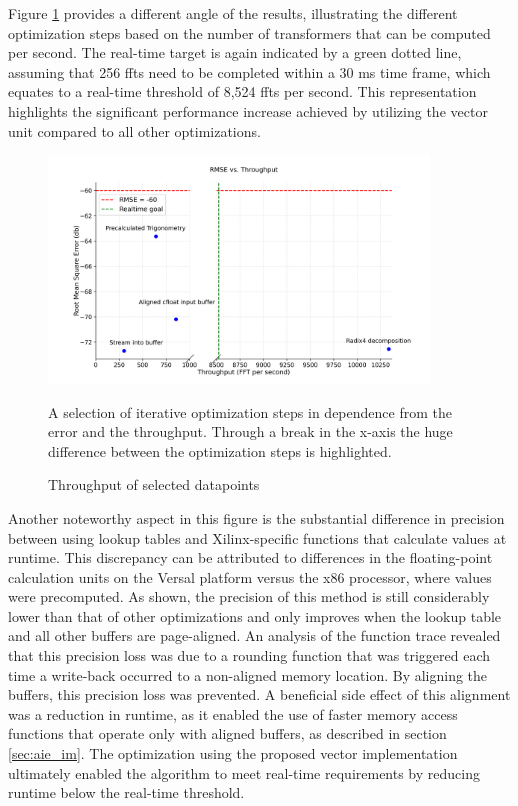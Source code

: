 Figure \ref{fig:plot2} provides a different angle of the results, illustrating the different optimization steps based on the number of transformers that can be computed per second. The real-time target is again indicated by a green dotted line, assuming that 256 \ac{fft}s need to be completed within a 30 ms time frame, which equates to a real-time threshold of 8,524 \ac{fft}s per second. This representation highlights the significant performance increase achieved by utilizing the vector unit compared to all other optimizations.\par 

\begin{figure}[h]
    \centering
    \includegraphics[width=0.9\textwidth]{images/throughput_plot.png}
    \captionsetup{justification=centering}
    \caption{Throughput of selected datapoints}
        A selection of iterative optimization steps in dependence from the error and the throughput. Through a break in the x-axis the huge difference between the optimization steps is highlighted.
    \label{fig:plot2}
\end{figure}

Another noteworthy aspect in this figure is the substantial difference in precision between using lookup tables and Xilinx-specific functions that calculate values at runtime. This discrepancy can be attributed to differences in the floating-point calculation units on the Versal platform versus the x86 processor, where values were precomputed. As shown, the precision of this method is still considerably lower than that of other optimizations and only improves when the lookup table and all other buffers are page-aligned. An analysis of the function trace revealed that this precision loss was due to a rounding function that was triggered each time a write-back occurred to a non-aligned memory location. By aligning the buffers, this precision loss was prevented. A beneficial side effect of this alignment was a reduction in runtime, as it enabled the use of faster memory access functions that operate only with aligned buffers, as described in section \ref{sec:aie_im}. The optimization using the proposed vector implementation ultimately enabled the algorithm to meet real-time requirements by reducing runtime below the real-time threshold.

